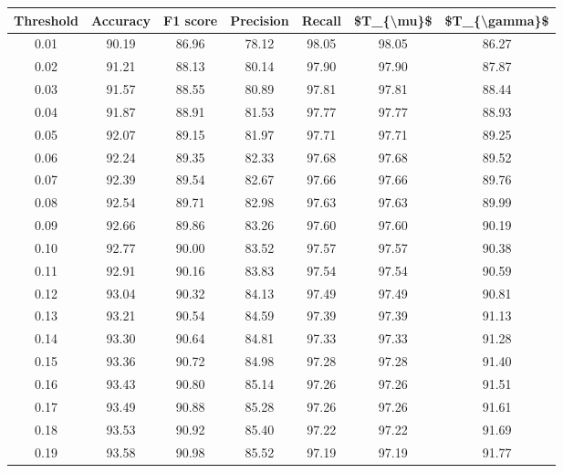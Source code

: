 \begin{tabular}{|c|c|c|c|c|c|c|}
\hline
 Threshold &  Accuracy &  F1 score &  Precision &  Recall &  \$T\_\{\textbackslash mu\}\$ &  \$T\_\{\textbackslash gamma\}\$ \\
\hline
      0.01 &     90.19 &     86.96 &      78.12 &   98.05 &      98.05 &         86.27 \\
      0.02 &     91.21 &     88.13 &      80.14 &   97.90 &      97.90 &         87.87 \\
      0.03 &     91.57 &     88.55 &      80.89 &   97.81 &      97.81 &         88.44 \\
      0.04 &     91.87 &     88.91 &      81.53 &   97.77 &      97.77 &         88.93 \\
      0.05 &     92.07 &     89.15 &      81.97 &   97.71 &      97.71 &         89.25 \\
      0.06 &     92.24 &     89.35 &      82.33 &   97.68 &      97.68 &         89.52 \\
      0.07 &     92.39 &     89.54 &      82.67 &   97.66 &      97.66 &         89.76 \\
      0.08 &     92.54 &     89.71 &      82.98 &   97.63 &      97.63 &         89.99 \\
      0.09 &     92.66 &     89.86 &      83.26 &   97.60 &      97.60 &         90.19 \\
      0.10 &     92.77 &     90.00 &      83.52 &   97.57 &      97.57 &         90.38 \\
      0.11 &     92.91 &     90.16 &      83.83 &   97.54 &      97.54 &         90.59 \\
      0.12 &     93.04 &     90.32 &      84.13 &   97.49 &      97.49 &         90.81 \\
      0.13 &     93.21 &     90.54 &      84.59 &   97.39 &      97.39 &         91.13 \\
      0.14 &     93.30 &     90.64 &      84.81 &   97.33 &      97.33 &         91.28 \\
      0.15 &     93.36 &     90.72 &      84.98 &   97.28 &      97.28 &         91.40 \\
      0.16 &     93.43 &     90.80 &      85.14 &   97.26 &      97.26 &         91.51 \\
      0.17 &     93.49 &     90.88 &      85.28 &   97.26 &      97.26 &         91.61 \\
      0.18 &     93.53 &     90.92 &      85.40 &   97.22 &      97.22 &         91.69 \\
      0.19 &     93.58 &     90.98 &      85.52 &   97.19 &      97.19 &         91.77 \\

\end{tabular}
